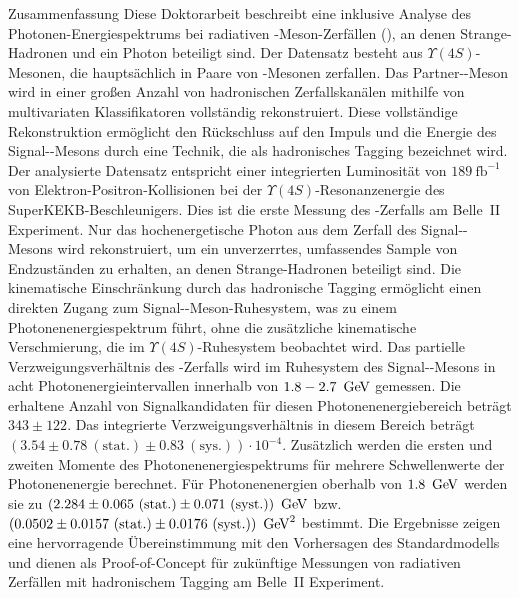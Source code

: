     \begin{abstractpage}{Zusammenfassung}
        \sloppy
        Diese Doktorarbeit beschreibt eine inklusive Analyse des Photonen-Energiespektrums bei radiativen \B-Meson-Zerfällen (\BtoXsgamma), an denen Strange-Hadronen und ein Photon beteiligt sind.
        Der Datensatz besteht aus $\Upsilon(4S)$-Mesonen, die hauptsächlich in Paare von \B-Mesonen zerfallen.
        Das Partner-\B-Meson wird in einer gro{\ss}en Anzahl von hadronischen Zerfallskanälen mithilfe von multivariaten Klassifikatoren vollständig rekonstruiert. 
        Diese vollständige Rekonstruktion ermöglicht den Rückschluss auf den Impuls und die Energie des Signal-\B-Mesons durch eine Technik, die als hadronisches Tagging bezeichnet wird.
        Der analysierte Datensatz entspricht einer integrierten Luminosität von $189~\mathrm{fb}^{-1}$ von Elektron-Positron-Kollisionen bei der $\Upsilon(4S)$-Resonanzenergie des SuperKEKB-Beschleunigers. 
        Dies ist die erste Messung des \BtoXsgamma-Zerfalls am Belle~II Experiment.
        Nur das hochenergetische Photon aus dem Zerfall des Signal-\B-Mesons wird rekonstruiert, um ein unverzerrtes, umfassendes Sample von Endzuständen zu erhalten, an denen Strange-Hadronen beteiligt sind. 
        Die kinematische Einschränkung durch das hadronische Tagging ermöglicht einen direkten Zugang zum Signal-\B-Meson-Ruhesystem, was zu einem Photonenenergiespektrum führt, ohne die zusätzliche kinematische Verschmierung, die im $\Upsilon(4S)$-Ruhesystem beobachtet wird.
        Das partielle Verzweigungsverh\"altnis des \BtoXsgamma-Zerfalls wird im Ruhesystem des Signal-\B-Mesons in acht Photonenergieintervallen innerhalb von $1.8 - 2.7~\mathrm{\,Ge\kern -0.1em V}$ gemessen. 
        Die erhaltene Anzahl von Signalkandidaten für diesen Photonenenergiebereich beträgt $343 \pm 122$. 
        Das integrierte Verzweigungsverhältnis in diesem Bereich beträgt \mbox{$(3.54 \pm 0.78~(\mathrm{stat.}) \pm 0.83~(\mathrm{sys.}))\cdot10^{-4}$}.
        Zusätzlich werden die ersten und zweiten Momente des Photonenenergiespektrums für mehrere Schwellenwerte der Photonenenergie berechnet. 
        Für Photonenenergien oberhalb von $1.8~\mathrm{\,Ge\kern -0.1em V}$ werden sie zu \mbox{$(2.284 \pm 0.065~(\mathrm{stat.})\pm 0.071~(\mathrm{syst.}))~\mathrm{\,Ge\kern -0.1em V}$} bzw. \mbox{$(0.0502 \pm 0.0157~(\mathrm{stat.}) \pm 0.0176~(\mathrm{syst.}))~\mathrm{\,Ge\kern -0.1em V}^2$} bestimmt.
        Die Ergebnisse zeigen eine hervorragende Übereinstimmung mit den Vorhersagen des Standardmodells und dienen als Proof-of-Concept für zukünftige Messungen von radiativen \BtoXsgamma Zerfällen mit hadronischem Tagging am Belle~II Experiment.
    \end{abstractpage}
    